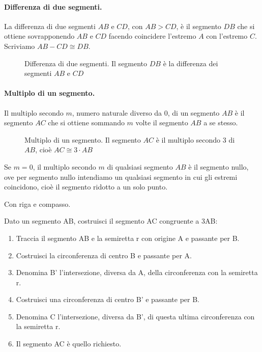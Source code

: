 \paragraph{Differenza di due segmenti.} La differenza di due segmenti 
$AB$ e $CD$, con $AB>CD$, è il segmento $DB$ che si ottiene 
sovrapponendo $AB$ e $CD$ facendo coincidere l'estremo $A$ con 
l'estremo $C$. Scriviamo $AB-CD \cong DB$.


\begin{inaccessibleblock}
 \begin{figure}[htb]
\centering
\caption{Differenza di due segmenti. Il segmento $DB$ è la differenza 
dei segmenti $AB$ e $CD$}
\end{figure}
\end{inaccessibleblock}

\paragraph{Multiplo di un segmento.} Il multiplo secondo $m$, numero 
naturale diverso da 0, di un segmento $AB$ è il segmento $AC$ che si 
ottiene sommando $m$ volte il segmento $AB$ a se stesso.

\begin{inaccessibleblock}
 \begin{figure}[htb]
\centering
\caption{Multiplo di un segmento. Il segmento $AC$ è il multiplo 
secondo 3 di $AB$, cioè $AC\cong 3\cdot AB$}
\end{figure}
\end{inaccessibleblock}

Se $m=0$, il multiplo secondo $m$ di qualsiasi segmento $AB$ è il 
segmento nullo, ove per segmento nullo intendiamo un qualsiasi 
segmento in cui gli estremi coincidono, cioè il segmento ridotto a un 
solo punto.

Con riga e compasso.

\begin{procedura}\label{proc:fonda_multiplo}
  Dato un segmento AB, costruisci il segmento AC congruente a 3AB:
  \begin{enumerate} [nosep]
    \item 
    Traccia il segmento AB e la semiretta r con origine A e passante per B.
    \item 
    Costruisci la circonferenza di centro B e passante per A.
    \item 
    Denomina B' l'intersezione, diversa da A, della circonferenza con la 
semiretta r.
    \item 
    Costruisci una circonferenza di centro B' e passante per B.
    \item 
    Denomina C l'intersezione, diversa da B', di questa ultima circonferenza 
con la semiretta r.
    \item 
    Il segmento AC è quello richiesto.
  \end{enumerate}
\end{procedura}

